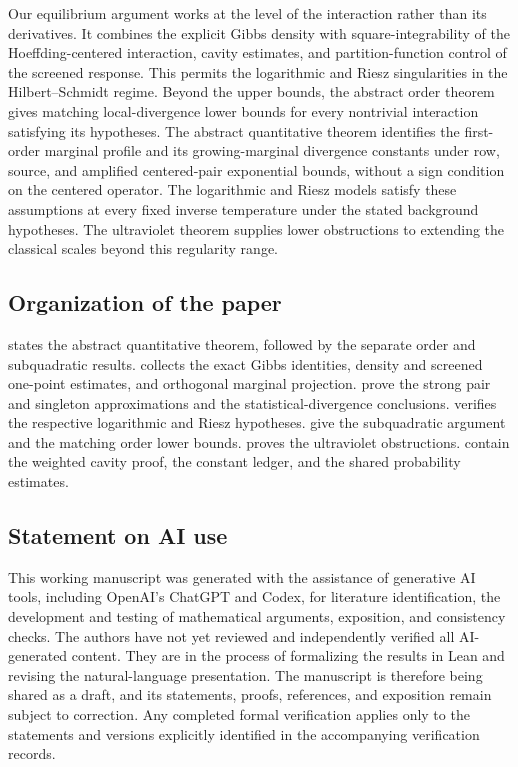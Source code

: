 \documentclass[11pt,reqno]{amsart}
\numberwithin{equation}{section}
\theoremstyle{plain}
\theoremstyle{remark}
\begin{document}
Our equilibrium argument works at the level of the interaction rather than its derivatives.  It combines the explicit Gibbs density with square-integrability of the Hoeffding-centered interaction, cavity estimates, and partition-function control of the screened response.  This permits the logarithmic and Riesz singularities in the Hilbert--Schmidt regime.  Beyond the upper bounds, the abstract order theorem gives matching local-divergence lower bounds for every nontrivial interaction satisfying its hypotheses.  The abstract quantitative theorem identifies the first-order marginal profile and its growing-marginal divergence constants under row, source, and amplified centered-pair exponential bounds, without a sign condition on the centered operator.  The logarithmic and Riesz models satisfy these assumptions at every fixed inverse temperature under the stated background hypotheses.
  The ultraviolet theorem supplies lower obstructions to extending the classical scales beyond this regularity range.

\subsection{Organization of the paper}
\label{subsec:organization}

 states the abstract quantitative theorem, followed by the separate order and subquadratic results.   collects the exact Gibbs identities, density and screened one-point estimates, and orthogonal marginal projection.   prove the strong pair and singleton approximations and the statistical-divergence conclusions.   verifies the respective logarithmic and Riesz hypotheses.   give the subquadratic argument and the matching order lower bounds.   proves the ultraviolet obstructions.   contain the weighted cavity proof, the constant ledger, and the shared probability estimates.

\subsection{Statement on AI use}

This working manuscript was generated with the assistance of generative AI tools, including OpenAI's ChatGPT and Codex, for literature identification, the development and testing of mathematical arguments, exposition, and consistency checks. The authors have not yet reviewed and independently verified all AI-generated content. They are in the process of formalizing the results in Lean and revising the natural-language presentation. The manuscript is therefore being shared as a draft, and its statements, proofs, references, and exposition remain subject to correction. Any completed formal verification applies only to the statements and versions explicitly identified in the accompanying verification records.
\end{document}
